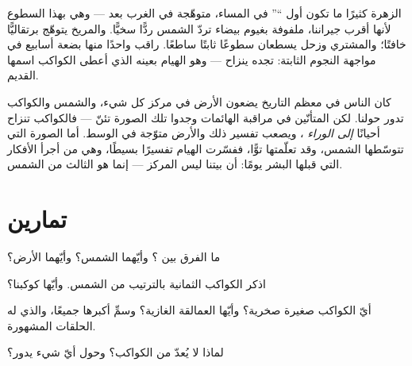 \begin{example}\label{ex:g4:solar-system:wanderers}
الزهرة كثيرًا ما تكون أول ``'' في المساء، متوهّجة في الغرب
بعد  --- وهي بهذا السطوع لأنها أقرب جيراننا، ملفوفة
بغيوم بيضاء تردّ  الشمس ردًّا سخيًّا. والمريخ يتوهّج
برتقاليًّا خافتًا؛ والمشتري وزحل يسطعان سطوعًا ثابتًا ساطعًا.
راقب واحدًا منها بضعة أسابيع في مواجهة النجوم الثابتة: تجده
ينزاح --- وهو الهيام بعينه الذي أعطى الكواكب اسمها القديم.
\end{example}

\begin{remark}\label{rem:g4:solar-system:history}
كان الناس في معظم التاريخ يضعون الأرض في مركز كل شيء، والشمس
 والكواكب تدور حولنا. لكن المتأنّين في مراقبة الهائمات
وجدوا تلك الصورة تئنّ --- فالكواكب تنزاح أحيانًا \emph{إلى
الوراء} ، ويصعب تفسير ذلك والأرض متوّجة في الوسط. أما الصورة
التي تتوسّطها الشمس، وقد تعلّمتها توًّا، ففسّرت الهيام تفسيرًا
بسيطًا، وهي من أجرأ الأفكار التي قبلها البشر يومًا: أن بيتنا
ليس المركز --- إنما هو  الثالث من الشمس.
\end{remark}

\section{تمارين}

\begin{exercise}[$\star$]\label{exo:g4:solar-system:1}
ما الفرق بين  ؟ وأيّهما الشمس؟ وأيّهما الأرض؟
\end{exercise}

\begin{exercise}[$\star$]\label{exo:g4:solar-system:2}
اذكر الكواكب الثمانية بالترتيب من الشمس. وأيّها كوكبنا؟
\end{exercise}

\begin{exercise}[$\star$]\label{exo:g4:solar-system:3}
أيّ الكواكب صغيرة صخرية؟ وأيّها العمالقة الغازية؟ وسمِّ أكبرها
جميعًا، والذي له الحلقات المشهورة.
\end{exercise}

\begin{exercise}[$\star$]\label{exo:g4:solar-system:4}
لماذا لا يُعدّ  من الكواكب؟ وحول أيّ شيء يدور؟
\end{exercise}

